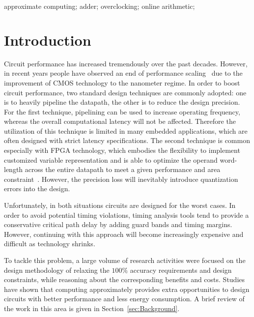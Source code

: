 \documentclass[10pt, conference, compsocconf]{IEEEtran}
\begin{document}
\begin{IEEEkeywords}
approximate computing; adder; overclocking; online arithmetic;

\end{IEEEkeywords}


\section{Introduction}
Circuit performance has increased tremendously over the past decades. However, in recent years people have observed an end of performance scaling~\cite{DarkSilicon2011} due to the improvement of CMOS technology to the nanometer regime. In order to boost circuit performance, two standard design techniques are commonly adopted: one is to heavily pipeline the datapath, the other is to reduce the design precision. For the first technique, pipelining can be used to increase operating frequency, whereas the overall computational latency will not be affected. Therefore the utilization of this technique is limited in many embedded applications, which are often designed with strict latency specifications. The second technique is common especially with FPGA technology, which embodies the flexibility to implement customized variable representation and is able to optimize the operand word-length across the entire datapath to meet a given performance and area constraint~\cite{GeorgeDT11}. However, the precision loss will inevitably introduce quantization errors into the design.

Unfortunately, in both situations circuits are designed for the worst cases. In order to avoid potential timing violations, timing analysis tools tend to provide a conservative critical path delay by adding guard bands and timing margins. However, continuing with this approach will become increasingly expensive and difficult as technology shrinks.

To tackle this problem, a large volume of research activities were focused on the design methodology of relaxing the $100\%$ accuracy requirements and design constraints, while reasoning about the corresponding benefits and costs. Studies have shown that computing approximately provides extra opportunities to design circuits with better performance and less energy consumption. A brief review of the work in this area is given in Section~\ref{sec:Background}.
\end{document}

